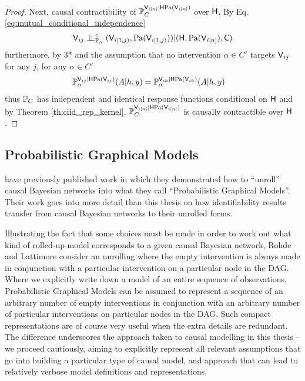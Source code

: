 \begin{proof}
Next, causal contractibility of $\mathbb{P}_C^{\mathsf{V}_{i[n]}|\mathsf{H}\mathrm{Pa}(\mathsf{V}_{i [n]})}$ over $\mathsf{H}$. By Eq. \ref{eq:mutual_conditional_independence}
\begin{align}
    \RV{V}_{ij}\CI^e_{\prob{P}_{\alpha}} (\RV{V}_{i [1,j)},\mathrm{Pa}(\RV{V}_{i [1,j)}) )|(\RV{H},\mathrm{Pa}(\RV{V}_{i[n]}),\RV{C})
\end{align}
furthermore, by 3* and the assumption that no intervention $\alpha\in C'$ targets $\mathsf{V}_{ij}$ for any $j$, for any $\alpha\in C'$
\begin{align}
    \mathbb{P}_{\alpha}^{\mathsf{V}_{ij}|\mathsf{H}\mathrm{Pa}(\mathsf{V}_{ij})}(A|h,y) &= \mathbb{P}_{\alpha}^{\mathsf{V}_{ik}|\mathsf{H}\mathrm{Pa}(\mathsf{V}_{ik})}(A|h,y) 
\end{align}
thus $\mathbb{P}_C$ has independent and identical response functions conditional on $\mathsf{H}$ and by Theorem \ref{th:ciid_rep_kernel}, $\mathbb{P}_C^{\mathsf{V}_{i[n]}|\mathsf{H}\mathrm{Pa}(\mathsf{V}_{i [n]})}$ is causally contractible over $\mathsf{H}$.
\end{proof}

\subsection[Probabilistic Graphical Models]{Probabilistic Graphical Models}

\citet{lattimore_replacing_2019,lattimore_causal_2019} have previously published work in which they demonstrated how to ``unroll'' causal Bayesian networks into what they call ``Probabilistic Graphical Models''. Their work goes into more detail than this thesis on how identifiability results transfer from causal Bayesian networks to their unrolled forms.

Illustrating the fact that some choices must be made in order to work out what kind of rolled-up model corresponds to a given causal Bayesian network, Rohde and Lattimore consider an unrolling where the empty intervention is always made in conjunction with a particular intervention on a particular node in the DAG. Where we explicitly write down a model of an entire sequence of observations, Probabilistic Graphical Models can be assumed to represent a sequence of an arbitrary number of empty interventions in conjunction with an arbitrary number of particular interventions on particular nodes in the DAG. Such compact representations are of course very useful when the extra details are redundant. The difference underscores the approach taken to causal modelling in this thesis -- we proceed cautiously, aiming to explicitly represent all relevant assumptions that go into building a particular type of causal model, and approach that can lead to relatively verbose model definitions and representations.

